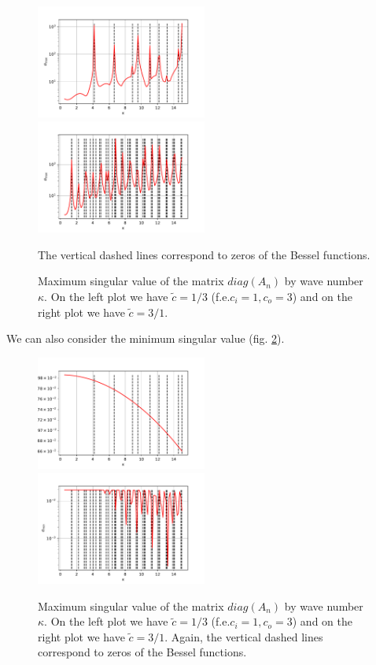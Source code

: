 \documentclass[10pt,journal,compsoc, onecolumn]{IEEEtran}
\begin{document}
\begin{figure}
    \includegraphics[width=0.5\textwidth]{scenario1MaximumSingVal.pdf}
    \includegraphics[width=0.5\textwidth]{scenario2MaximumSingVal.pdf}
    \caption{Maximum singular value of the matrix $diag(A_n)$ by wave number $\kappa$. 
     On the left plot we have $\tilde c = 1/3$ (f.e.$c_i = 1, c_o = 3$)
    and on the right plot we have $\tilde c = 3/1$. } The vertical dashed lines correspond to zeros of the Bessel functions. 
   \label{fig:max_sing_val}
\end{figure}
We can also consider the minimum singular value (fig. \ref{fig:min_sing_val}).
\begin{figure}
    \includegraphics[width=0.5\textwidth]{scenario1MinimumSingVal.pdf}
    \includegraphics[width=0.5\textwidth]{scenario2MinimumSingVal.pdf}
    \caption{Maximum singular value of the matrix $diag(A_n)$ by wave number $\kappa$. 
     On the left plot we have $\tilde c = 1/3$ (f.e.$c_i = 1, c_o = 3$)
    and on the right plot we have $\tilde c = 3/1$.  Again, the vertical dashed lines correspond to zeros of the Bessel functions. }
   \label{fig:min_sing_val}
\end{figure}
\end{document}
